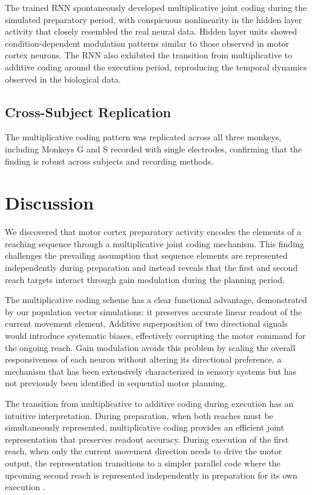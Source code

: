 \documentclass[12pt]{article}
\begin{document}
The trained RNN spontaneously developed multiplicative joint coding during the simulated preparatory period, with conspicuous nonlinearity in the hidden layer activity that closely resembled the real neural data. Hidden layer units showed condition-dependent modulation patterns similar to those observed in motor cortex neurons. The RNN also exhibited the transition from multiplicative to additive coding around the execution period, reproducing the temporal dynamics observed in the biological data.

\subsection{Cross-Subject Replication}

The multiplicative coding pattern was replicated across all three monkeys, including Monkeys G and S recorded with single electrodes, confirming that the finding is robust across subjects and recording methods.

\section{Discussion}

We discovered that motor cortex preparatory activity encodes the elements of a reaching sequence through a multiplicative joint coding mechanism. This finding challenges the prevailing assumption that sequence elements are represented independently during preparation \citep{cisek2005neural, averbeck2002parallel} and instead reveals that the first and second reach targets interact through gain modulation \citep{salinas2000gain} during the planning period.

The multiplicative coding scheme has a clear functional advantage, demonstrated by our population vector simulations: it preserves accurate linear readout of the current movement element. Additive superposition of two directional signals would introduce systematic biases, effectively corrupting the motor command for the ongoing reach. Gain modulation avoids this problem by scaling the overall responsiveness of each neuron without altering its directional preference, a mechanism that has been extensively characterized in sensory systems \citep{salinas2000gain} but has not previously been identified in sequential motor planning.

The transition from multiplicative to additive coding during execution has an intuitive interpretation. During preparation, when both reaches must be simultaneously represented, multiplicative coding provides an efficient joint representation that preserves readout accuracy. During execution of the first reach, when only the current movement direction needs to drive the motor output, the representation transitions to a simpler parallel code where the upcoming second reach is represented independently in preparation for its own execution \citep{kaufman2014cortical, lara2018different}.
\end{document}
